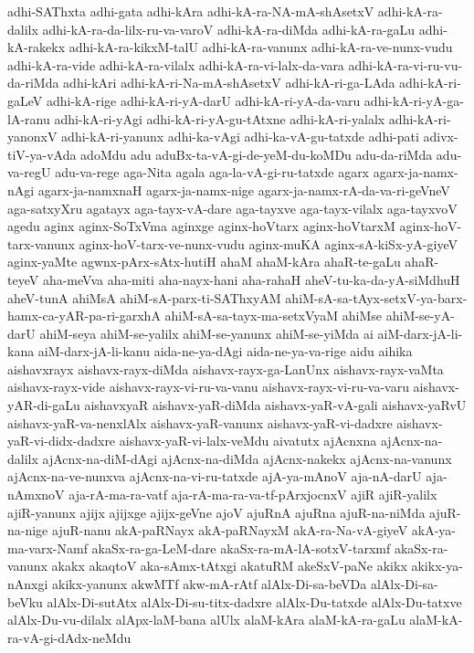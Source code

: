 {adhi-SAThxta
adhi-gata
adhi-kAra
adhi-kA-ra-NA-mA-shAsetxV
adhi-kA-ra-dalilx
adhi-kA-ra-da-lilx-ru-va-varoV
adhi-kA-ra-diMda
adhi-kA-ra-gaLu
adhi-kA-rakekx
adhi-kA-ra-kikxM-talU
adhi-kA-ra-vanunx
adhi-kA-ra-ve-nunx-vudu
adhi-kA-ra-vide
adhi-kA-ra-vilalx
adhi-kA-ra-vi-lalx-da-vara
adhi-kA-ra-vi-ru-vu-da-riMda
adhi-kAri
adhi-kA-ri-Na-mA-shAsetxV
adhi-kA-ri-ga-LAda
adhi-kA-ri-gaLeV
adhi-kA-rige
adhi-kA-ri-yA-darU
adhi-kA-ri-yA-da-varu
adhi-kA-ri-yA-ga-lA-ranu
adhi-kA-ri-yAgi
adhi-kA-ri-yA-gu-tAtxne
adhi-kA-ri-yalalx
adhi-kA-ri-yanonxV
adhi-kA-ri-yanunx
adhi-ka-vAgi
adhi-ka-vA-gu-tatxde
adhi-pati
adivx-tiV-ya-vAda
adoMdu
adu
aduBx-ta-vA-gi-de-yeM-du-koMDu
adu-da-riMda
adu-va-regU
adu-va-rege
aga-Nita
agala
aga-la-vA-gi-ru-tatxde
agarx
agarx-ja-namx-nAgi
agarx-ja-namxnaH
agarx-ja-namx-nige
agarx-ja-namx-rA-da-va-ri-geVneV
aga-satxyXru
agatayx
aga-tayx-vA-dare
aga-tayxve
aga-tayx-vilalx
aga-tayxvoV
agedu
aginx
aginx-SoTxVma
aginxge
aginx-hoVtarx
aginx-hoVtarxM
aginx-hoV-tarx-vanunx
aginx-hoV-tarx-ve-nunx-vudu
aginx-muKA
aginx-sA-kiSx-yA-giyeV
aginx-yaMte
agwnx-pArx-sAtx-hutiH
ahaM
ahaM-kAra
ahaR-te-gaLu
ahaR-teyeV
aha-meVva
aha-miti
aha-nayx-hani
aha-rahaH
aheV-tu-ka-da-yA-siMdhuH
aheV-tunA
ahiMsA
ahiM-sA-parx-ti-SAThxyAM
ahiM-sA-sa-tAyx-setxV-ya-barx-hamx-ca-yAR-pa-ri-garxhA
ahiM-sA-sa-tayx-ma-setxVyaM
ahiMse
ahiM-se-yA-darU
ahiM-seya
ahiM-se-yalilx
ahiM-se-yanunx
ahiM-se-yiMda
ai
aiM-darx-jA-li-kana
aiM-darx-jA-li-kanu
aida-ne-ya-dAgi
aida-ne-ya-va-rige
aidu
aihika
aishavxrayx
aishavx-rayx-diMda
aishavx-rayx-ga-LanUnx
aishavx-rayx-vaMta
aishavx-rayx-vide
aishavx-rayx-vi-ru-va-vanu
aishavx-rayx-vi-ru-va-varu
aishavx-yAR-di-gaLu
aishavxyaR
aishavx-yaR-diMda
aishavx-yaR-vA-gali
aishavx-yaRvU
aishavx-yaR-va-nenxlAlx
aishavx-yaR-vanunx
aishavx-yaR-vi-dadxre
aishavx-yaR-vi-didx-dadxre
aishavx-yaR-vi-lalx-veMdu
aivatutx
ajAcnxna
ajAcnx-na-dalilx
ajAcnx-na-diM-dAgi
ajAcnx-na-diMda
ajAcnx-nakekx
ajAcnx-na-vanunx
ajAcnx-na-ve-nunxva
ajAcnx-na-vi-ru-tatxde
ajA-ya-mAnoV
aja-nA-darU
aja-nAmxnoV
aja-rA-ma-ra-vatf
aja-rA-ma-ra-va-tf-pArxjocnxV
ajiR
ajiR-yalilx
ajiR-yanunx
ajijx
ajijxge
ajijx-geVne
ajoV
ajuRnA
ajuRna
ajuR-na-niMda
ajuR-na-nige
ajuR-nanu
akA-paRNayx
akA-paRNayxM
akA-ra-Na-vA-giyeV
akA-ya-ma-varx-Namf
akaSx-ra-ga-LeM-dare
akaSx-ra-mA-lA-sotxV-tarxmf
akaSx-ra-vanunx
akakx
akaqtoV
aka-sAmx-tAtxgi
akatuRM
akeSxV-paNe
akikx
akikx-ya-nAnxgi
akikx-yanunx
akwMTf
akw-mA-rAtf
alAlx-Di-sa-beVDa
alAlx-Di-sa-beVku
alAlx-Di-sutAtx
alAlx-Di-su-titx-dadxre
alAlx-Du-tatxde
alAlx-Du-tatxve
alAlx-Du-vu-dilalx
alApx-laM-bana
alUlx
alaM-kAra
alaM-kA-ra-gaLu
alaM-kA-ra-vA-gi-dAdx-neMdu
}
